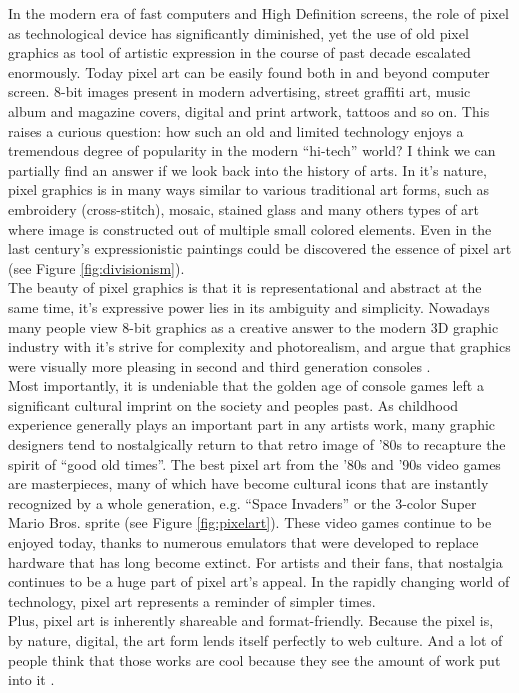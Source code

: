 \documentclass[]{usiinfbachelorproject}
\begin{document}
In the modern era of fast computers and High Definition screens, the role of pixel as technological device has significantly diminished, yet the use of old pixel graphics as tool of artistic expression in the course of past decade escalated enormously. Today pixel art can be easily found both in and beyond computer screen. 8-bit images present in modern advertising, street graffiti art, music album and magazine covers, digital and print artwork, tattoos and so on. This raises a curious question: how such an old and limited technology enjoys a tremendous degree of popularity in the modern ``hi-tech'' world? I think we can partially find an answer if we look back into the history of arts. In it's nature, pixel graphics is in many ways similar to various traditional art forms, such as embroidery (cross-stitch), mosaic, stained glass and many others types of art where image is constructed out of multiple small colored elements. Even in the last century's expressionistic paintings could be discovered the essence of pixel art (see Figure \ref{fig:divisionism}). \\
The beauty of pixel graphics is that it is representational and abstract at the same time, it's expressive power lies in its ambiguity and simplicity. Nowadays many people view 8-bit graphics as a creative answer to the modern 3D graphic industry with it's strive for complexity and photorealism, and argue that graphics were visually more pleasing in second and third generation consoles \cite{website:nostalgia}.\\
Most importantly, it is undeniable that the golden age of console games left a significant cultural imprint on the society and peoples past. As childhood experience generally plays an important part in any artists work, many graphic designers tend to nostalgically return to that retro image of '80s to recapture the spirit of ``good old times''. The best pixel art from the '80s and '90s video games are masterpieces, many of which have become cultural icons that are instantly recognized by a whole generation, e.g. ``Space Invaders'' or the 3-color Super Mario Bros. sprite (see Figure \ref{fig:pixelart}). These video games continue to be enjoyed today, thanks to numerous emulators that were developed to replace hardware that has long become extinct. For artists and their fans, that nostalgia continues to be a huge part of pixel art's appeal. In the rapidly changing world of technology, pixel art represents a reminder of simpler times. \\
Plus, pixel art is inherently shareable and format-friendly. Because the pixel is, by nature, digital, the art form lends itself perfectly to web culture. And a lot of people think that those works are cool because they see the amount of work put into it \cite{website:nostalgia}.\\
\end{document}
